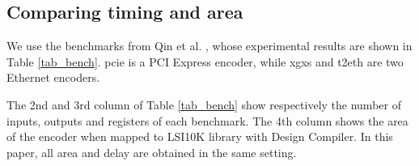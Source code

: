 \documentclass[conference]{IEEEtran}
\begin{document}

\subsection{Comparing timing and area}
We use the benchmarks from Qin et al. \cite{QinTODAES15},
whose experimental results are shown in Table \ref{tab_bench}.
pcie is a PCI Express \cite{pcie} encoder,
while xgxs and t2eth are two Ethernet \cite{IEEE8023_S4} encoders.

The 2nd and 3rd column of Table \ref{tab_bench} show respectively the number of inputs, outputs and registers of each benchmark.
The 4th column shows the area of the encoder when mapped to LSI10K library with Design Compiler.
In this paper, 
all area and delay are obtained in the same setting.
\end{document}

